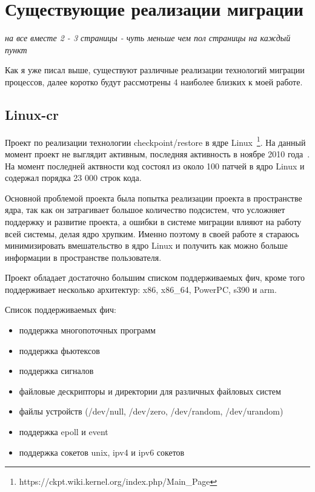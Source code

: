 \section{Существующие реализации миграции}

\textit{на все вместе 2 - 3 страницы - чуть меньше чем пол страницы на каждый пункт}

Как я уже писал выше, существуют различные реализации технологий миграции процессов, далее коротко будут рассмотрены 4 наиболее близких к моей работе.

\subsection{Linux-cr}

Проект по реализации технологии checkpoint/restore в ядре Linux~\footnote{https://ckpt.wiki.kernel.org/index.php/Main\_Page}. На данный момент проект не выглядит активным, последняя активность в ноябре 2010 года~\cite{linux_cr_lwn_report}. На момент последней актвности код состоял из около 100 патчей в ядро Linux и содержал порядка 23 000 строк кода.

Основной проблемой проекта была попытка реализации проекта в пространстве ядра, так как он затрагивает большое количество подсистем, что усложняет поддержку и развитие проекта, а ошибки в системе миграции влияют на работу всей системы, делая ядро хрупким. Именно поэтому в своей работе я стараюсь минимизировать вмешательство в ядро Linux и получить как можно больше информации в пространстве пользователя.

Проект обладает достаточно большим списком поддерживаемых фич, кроме того поддерживает несколько архитектур: x86, x86\_64, PowerPC, s390 и arm.

Список поддерживаемых фич:

\begin{itemize}

    \item поддержка многопоточных программ
    \item поддержка фьютексов
    \item поддержка сигналов
    \item файловые дескрипторы и директории для различных файловых систем
    \item файлы устройств (/dev/null, /dev/zero, /dev/random, /dev/urandom)
    \item поддержка epoll и event
    \item поддержка сокетов unix, ipv4 и ipv6 сокетов

\end{itemize}

